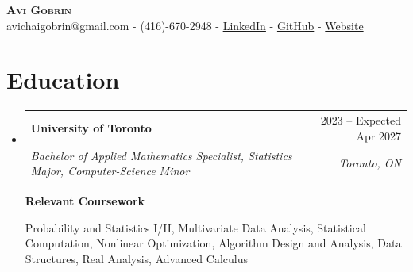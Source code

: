 \documentclass[letterpaper,11pt]{article}
\makeatletter
\newcommand{\resumeSubheading}[4]{
  \vspace{-2pt}\item
    \begin{tabular*}{0.97\textwidth}[t]{l@{\extracolsep{\fill}}r}
      \textbf{#1} & #2 \\
      \textit{\small#3} & \textit{\small #4} \\
    \end{tabular*}\vspace{-5pt}
}
\newcommand{\resumeSubHeadingListStart}{\begin{itemize}[leftmargin=0.15in, label={}]}
\newcommand{\resumeSubHeadingListEnd}{\end{itemize}}
\makeatother
\begin{document}
\begin{center}
    \textbf{\Huge \scshape Avi Gobrin} \\ \vspace{4pt}
    \small avichaigobrin@gmail.com - (416)-670-2948 - \href{https://www.linkedin.com/in/avigobrin/}{\color{blue} LinkedIn} - \href{https://github.com/Avi-Gobrin}{\color{blue} GitHub} - \href{https://avi-gobrin.github.io/personal-site/}{\color{blue} Website} \vspace{-4pt}
\end{center}

\section{Education}
  \resumeSubHeadingListStart
    \resumeSubheading
      {University of Toronto}{2023 -- Expected Apr 2027}
      {Bachelor of Applied Mathematics Specialist, Statistics Major, Computer-Science Minor}{Toronto, ON}
      \vspace{4pt}

    {\bf Relevant Coursework}
\vspace{-7pt}
{\small\setlength{\topsep}{0pt}\setlength{\parskip}{0pt}
\begin{flushleft}
Probability and Statistics I/II, Multivariate Data Analysis, Statistical Computation, Nonlinear Optimization, Algorithm Design and Analysis, Data Structures, Real Analysis, Advanced Calculus
\end{flushleft}}
  \resumeSubHeadingListEnd

\vspace{-15pt}
\end{document}
